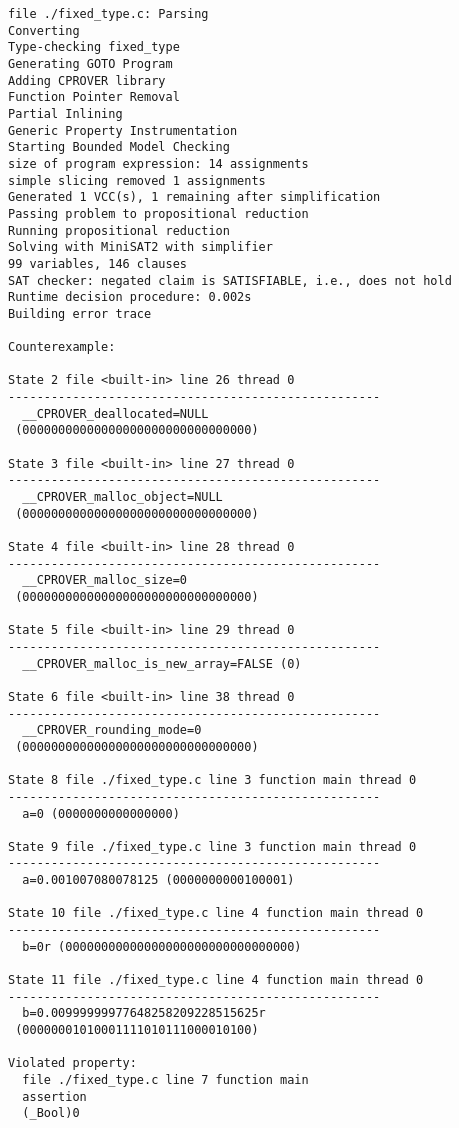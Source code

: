\begin{lstlisting}
file ./fixed_type.c: Parsing
Converting
Type-checking fixed_type
Generating GOTO Program
Adding CPROVER library
Function Pointer Removal
Partial Inlining
Generic Property Instrumentation
Starting Bounded Model Checking
size of program expression: 14 assignments
simple slicing removed 1 assignments
Generated 1 VCC(s), 1 remaining after simplification
Passing problem to propositional reduction
Running propositional reduction
Solving with MiniSAT2 with simplifier
99 variables, 146 clauses
SAT checker: negated claim is SATISFIABLE, i.e., does not hold
Runtime decision procedure: 0.002s
Building error trace

Counterexample:

State 2 file <built-in> line 26 thread 0
----------------------------------------------------
  __CPROVER_deallocated=NULL
 (00000000000000000000000000000000)

State 3 file <built-in> line 27 thread 0
----------------------------------------------------
  __CPROVER_malloc_object=NULL
 (00000000000000000000000000000000)

State 4 file <built-in> line 28 thread 0
----------------------------------------------------
  __CPROVER_malloc_size=0
 (00000000000000000000000000000000)

State 5 file <built-in> line 29 thread 0
----------------------------------------------------
  __CPROVER_malloc_is_new_array=FALSE (0)

State 6 file <built-in> line 38 thread 0
----------------------------------------------------
  __CPROVER_rounding_mode=0
 (00000000000000000000000000000000)

State 8 file ./fixed_type.c line 3 function main thread 0
----------------------------------------------------
  a=0 (0000000000000000)

State 9 file ./fixed_type.c line 3 function main thread 0
----------------------------------------------------
  a=0.001007080078125 (0000000000100001)

State 10 file ./fixed_type.c line 4 function main thread 0
----------------------------------------------------
  b=0r (00000000000000000000000000000000)

State 11 file ./fixed_type.c line 4 function main thread 0
----------------------------------------------------
  b=0.00999999977648258209228515625r
 (00000001010001111010111000010100)

Violated property:
  file ./fixed_type.c line 7 function main
  assertion
  (_Bool)0
\end{lstlisting}


